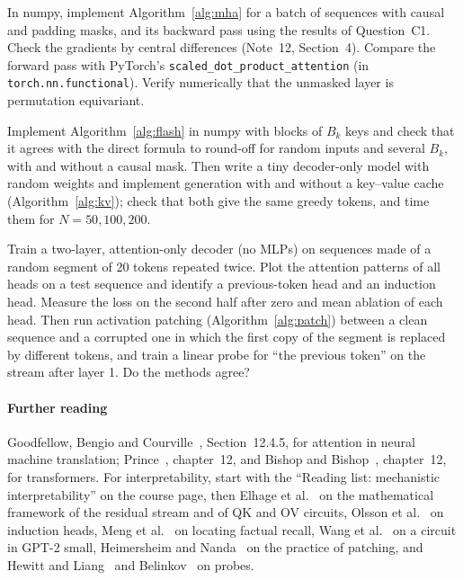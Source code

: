 \documentclass[11pt]{article}
\begin{document}
\begin{questions}
\begin{programming}
\item In numpy, implement Algorithm~\ref{alg:mha} for a batch of sequences with causal and padding masks, and its backward
  pass using the results of Question~C1. Check the gradients by central differences (Note~12, Section~4).
  Compare the forward pass with PyTorch's \texttt{scaled\_\allowbreak dot\_\allowbreak product\_\allowbreak attention} (in \texttt{torch.nn.functional}). Verify numerically that the unmasked layer is
  permutation equivariant.
\item Implement Algorithm~\ref{alg:flash} in numpy with blocks of $B_k$ keys and check that it agrees with the direct formula
  to round-off for random inputs and several $B_k$, with and without a causal mask. Then write a tiny decoder-only model with
  random weights and implement generation with and without a key--value cache (Algorithm~\ref{alg:kv}); check that both
  give the same greedy tokens, and time them for $N = 50, 100, 200$.
\item Train a two-layer, attention-only decoder (no MLPs) on sequences made of a random segment of 20 tokens repeated twice.
  Plot the attention patterns of all heads on a test sequence and identify a previous-token head and an induction head.
  Measure the loss on the second half after zero and mean ablation of each head. Then run activation patching
  (Algorithm~\ref{alg:patch}) between a clean sequence and a corrupted one in which the first copy of the segment is
  replaced by different tokens, and train a linear probe for ``the previous token'' on the stream after layer 1. Do the methods agree?
\end{programming}
\end{questions}

\paragraph{Further reading} Goodfellow, Bengio and Courville~\cite{goodfellow2016}, Section~12.4.5, for attention in
neural machine translation; Prince~\cite{prince2023}, chapter~12, and Bishop and Bishop~\cite{bishop2024}, chapter~12, for
transformers. For interpretability, start with the ``Reading list: mechanistic interpretability'' on the course page, then
Elhage et al.~\cite{elhage2021} on the mathematical framework of the residual stream and of QK and OV circuits, Olsson et
al.~\cite{olsson2022} on induction heads, Meng et al.~\cite{meng2022} on locating factual recall, Wang et
al.~\cite{wang2023} on a circuit in GPT-2 small, Heimersheim and Nanda~\cite{heimersheim2024} on the practice of patching,
and Hewitt and Liang~\cite{hewitt2019} and Belinkov~\cite{belinkov2022} on probes.
\end{document}
